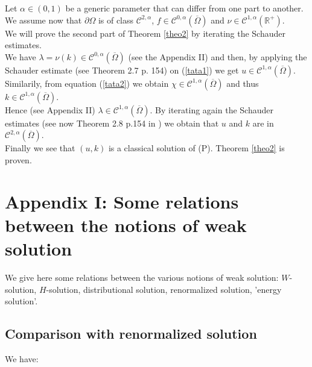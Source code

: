 \documentclass{elsart}
\begin{document}
Let $\alpha\in (0,1)$ be a generic parameter that can differ from one
part to another. We 
assume now that $\partial \Omega$ is of class
$\mathcal{C}^{2,\alpha}$, $f \in
\mathcal{C}^{0,\alpha}(\overline{\Omega})$ and $\nu \in
\mathcal{C}^{1,\alpha}(\mathbb R^{+})$. \\ 
We will prove the second part of Theorem \ref{theo2} by iterating the Schauder estimates. \\ 
We have $\lambda=\nu(k) \in \mathcal{C}^{0,\alpha}(\overline{\Omega})$
 (see the Appendix II) and then, by applying the Schauder estimate (see \cite{chen} Theorem 2.7
p. 154) on (\ref{tata1}) we get 
$u\in \mathcal{C}^{1,\alpha}(\overline{\Omega})$. Similarily, from
equation (\ref{tata2}) we obtain 
$\chi \in \mathcal{C}^{1,\alpha}(\overline{\Omega})$ 
and thus 
$k \in \mathcal{C}^{1,\alpha}(\overline{\Omega})$. \\ 
Hence (see Appendix II) $\lambda \in  \mathcal{C}^{1,\alpha}(\overline{\Omega})$. By 
iterating again the Schauder estimates (see now Theorem 2.8 p.154 in \cite{chen}) we obtain that 
$u$ and $k$ are in $\mathcal{C}^{2,\alpha}(\overline{\Omega})$. \\ 
Finally we see that $(u,k)$ is a classical solution of (P). Theorem
\ref{theo2} is proven.

\section*{Appendix I: Some relations between the notions of weak solution}

We give here some relations between the various notions of weak
solution: $W$-solution, $H$-solution, distributional solution,
renormalized solution, 'energy solution'.

\subsection*{Comparison with renormalized solution}

We have: 
\end{document}
